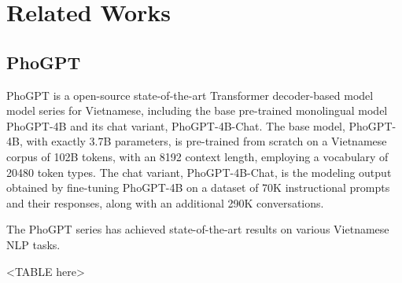 \chapter{Related Works}

\section{PhoGPT}
PhoGPT \cite{nguyen2024phogptgenerativepretrainingvietnamese} is a open-source state-of-the-art Transformer decoder-based model model series for Vietnamese, including the base pre-trained monolingual model PhoGPT-4B and its chat variant, PhoGPT-4B-Chat. The base model, PhoGPT-4B, with exactly 3.7B parameters, is pre-trained from scratch on a Vietnamese corpus of 102B tokens, with an 8192 context length, employing a vocabulary of 20480 token types. The chat variant, PhoGPT-4B-Chat, is the modeling output obtained by fine-tuning PhoGPT-4B on a dataset of 70K instructional prompts and their responses, along with an additional 290K conversations. \par
The PhoGPT series has achieved state-of-the-art results on various Vietnamese NLP tasks. \par
<TABLE here>

